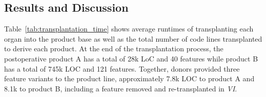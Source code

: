\subsection{Results and Discussion} \label{sec:result_discussion}


 
Table~\ref{tab:transplantation_time} shows average runtimes of transplanting each organ into the product base as well as the total number of code lines transplanted to derive each product. At the end of the transplantation process, the postoperative product A has a total of 28k LoC and 40 features while product B has a total of 745k LOC and 121 features. Together, donors provided three feature variants to the product line, approximately 7.8k LOC to product A and 8.1k to product B, including a feature removed and re-transplanted in \emph{VI}.

